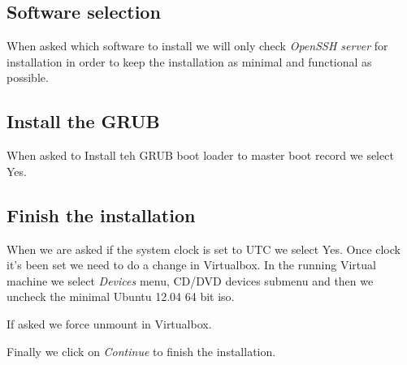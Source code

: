 \subsection {Software selection}
When asked which software to install we will only check \textit{OpenSSH server} for installation in order to keep the installation as minimal and functional as possible.

\subsection {Install the GRUB}
When asked to Install teh GRUB boot loader to master boot record we select Yes.

\subsection {Finish the installation}
When we are asked if the system clock is set to UTC we select Yes. Once clock it's been set we need to do a change in Virtualbox. In the running Virtual machine we select \textit{Devices} menu, CD/DVD devices submenu and then we uncheck the minimal Ubuntu 12.04 64 bit iso.

If asked we force unmount in Virtualbox.

Finally we click on \textit{Continue} to finish the installation.
